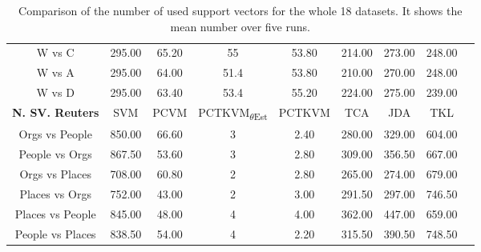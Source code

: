 \begin{table}[]
{\begin{tabular}{@{}ccccccccc@{}}
			W vs C                           & 295.00  & 65.20  & 55                                   & 53.80  & 214.00 & 273.00 & 248.00 \\
			W vs A                           & 295.00  & 64.00  & 51.4                                   & 53.80  & 210.00 & 270.00 & 248.00 \\
			W vs D                           & 295.00  & 63.40  & 53.4                                   & 55.20  & 224.00 & 275.00 & 239.00 \\ \midrule
			\textbf{N. SV. Reuters}        & SVM     & PCVM   & PCTKVM\textsubscript{$\theta$Est} & PCTKVM & TCA    & JDA   & TKL    \\ \midrule
			Orgs vs People                   & 850.00  & 66.60  & 3                                  & 2.40   & 280.00 & 329.00 & 604.00 \\
			People vs Orgs                   & 867.50  & 53.60  & 3                                  & 2.80   & 309.00 & 356.50 & 667.00 \\
			Orgs vs Places                   & 708.00  & 60.80  & 2                                  & 2.80   & 265.00 & 274.00 & 679.00 \\
			Places vs Orgs                   & 752.00  & 43.00  & 2                                  & 3.00   & 291.50 & 297.00 & 746.50 \\
			Places vs People                 & 845.00  & 48.00  & 4                                  & 4.00   & 362.00 & 447.00 & 659.00 \\
			People vs Places                 & 838.50  & 54.00  & 4                                  & 2.20   & 315.50 & 390.50 & 748.50 \\ \bottomrule
	\end{tabular}}
	\caption[Complete Nnumber of used Support Vectors]{Comparison of the number of used support vectors for the whole 18 datasets. It shows the mean number over five runs.\label{BTableCompleteNvec}}
\end{table}

